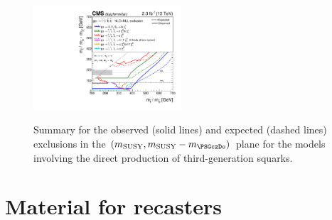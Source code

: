 \clearpage
\begin{figure}[!h]
  \begin{center}
    \includegraphics[width=0.49\textwidth]{Supplementary/allThirdGenZoomSUMMARY_transposed_aux} \\
    \caption{Summary for the observed (solid lines) and expected
      (dashed lines) exclusions in the $(m_{\mathrm{SUSY}},
      m_{\mathrm{SUSY}} - m_{\PSGczDo})$ plane for the models
      involving the direct production of third-generation squarks. 
      \label{fig:third-gen-summary-zoomed-plots} }
  \end{center}
\end{figure}

\clearpage
\section{Material for recasters}

